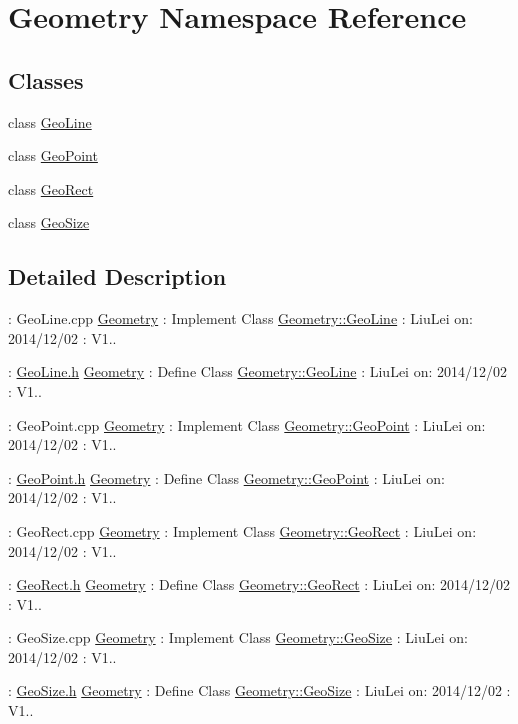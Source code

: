 \hypertarget{namespace_geometry}{\section{Geometry Namespace Reference}
\label{namespace_geometry}
}
\subsection*{Classes}
\begin{DoxyCompactItemize}
\item 
class \hyperlink{class_geometry_1_1_geo_line}{Geo\+Line}
\item 
class \hyperlink{class_geometry_1_1_geo_point}{Geo\+Point}
\item 
class \hyperlink{class_geometry_1_1_geo_rect}{Geo\+Rect}
\item 
class \hyperlink{class_geometry_1_1_geo_size}{Geo\+Size}
\end{DoxyCompactItemize}


\subsection{Detailed Description}
\+: Geo\+Line.\+cpp  \hyperlink{namespace_geometry}{Geometry} \+: Implement Class \hyperlink{class_geometry_1_1_geo_line}{Geometry\+::\+Geo\+Line} \+: Liu\+Lei  on\+: 2014/12/02 \+: V1..

\+: \hyperlink{_geo_line_8h_source}{Geo\+Line.\+h}  \hyperlink{namespace_geometry}{Geometry} \+: Define Class \hyperlink{class_geometry_1_1_geo_line}{Geometry\+::\+Geo\+Line} \+: Liu\+Lei  on\+: 2014/12/02 \+: V1..

\+: Geo\+Point.\+cpp  \hyperlink{namespace_geometry}{Geometry} \+: Implement Class \hyperlink{class_geometry_1_1_geo_point}{Geometry\+::\+Geo\+Point} \+: Liu\+Lei  on\+: 2014/12/02 \+: V1..

\+: \hyperlink{_geo_point_8h_source}{Geo\+Point.\+h}  \hyperlink{namespace_geometry}{Geometry} \+: Define Class \hyperlink{class_geometry_1_1_geo_point}{Geometry\+::\+Geo\+Point} \+: Liu\+Lei  on\+: 2014/12/02 \+: V1..

\+: Geo\+Rect.\+cpp  \hyperlink{namespace_geometry}{Geometry} \+: Implement Class \hyperlink{class_geometry_1_1_geo_rect}{Geometry\+::\+Geo\+Rect} \+: Liu\+Lei  on\+: 2014/12/02 \+: V1..

\+: \hyperlink{_geo_rect_8h_source}{Geo\+Rect.\+h}  \hyperlink{namespace_geometry}{Geometry} \+: Define Class \hyperlink{class_geometry_1_1_geo_rect}{Geometry\+::\+Geo\+Rect} \+: Liu\+Lei  on\+: 2014/12/02 \+: V1..

\+: Geo\+Size.\+cpp  \hyperlink{namespace_geometry}{Geometry} \+: Implement Class \hyperlink{class_geometry_1_1_geo_size}{Geometry\+::\+Geo\+Size} \+: Liu\+Lei  on\+: 2014/12/02 \+: V1..

\+: \hyperlink{_geo_size_8h_source}{Geo\+Size.\+h}  \hyperlink{namespace_geometry}{Geometry} \+: Define Class \hyperlink{class_geometry_1_1_geo_size}{Geometry\+::\+Geo\+Size} \+: Liu\+Lei  on\+: 2014/12/02 \+: V1.. 